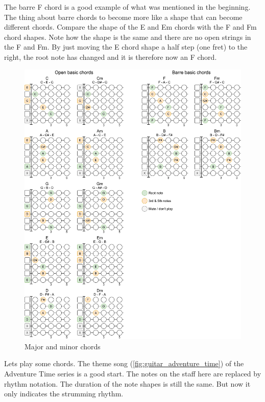 The barre F chord is a good example of what was mentioned in the beginning. The thing about barre chords to become more like a shape that can become different chords. Compare the shape of the E and Em chords with the F and Fm chord shapes. Note how the shape is the same and there are no open strings in the F and Fm. By just moving the E chord shape a half step (one fret) to the right, the root note has changed and it is therefore now an F chord.

\newpage



\begin{figure}[h]
	\centering
	\includegraphics[height=0.8\textheight]{../../Images/GuitarBasicChords.png}
	\caption{Major and minor chords}
	\label{fig:guitar_major_minor_chords}
\end{figure}

\clearpage

Lets play some chords. The theme song (\autoref{fig:guitar_adventure_time}) of the Adventure Time series is a good start. The notes on the staff here are replaced by rhythm notation. The duration of the note shapes is still the same. But now it only indicates the strumming rhythm.

